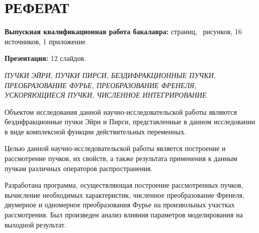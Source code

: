     \section*{РЕФЕРАТ}
    {
    \textbf{Выпускная квалификационная работа бакалавра:}
    \pageref{LastPage} страниц,
    \totalfigures\ рисунков,
    16 источников,
    1 приложение.

    \textbf{Презентация:} 12 слайдов.

    \textit{ПУЧКИ ЭЙРИ, ПУЧКИ ПИРСИ, БЕЗДИФРАКЦИОННЫЕ ПУЧКИ, \\ ПРЕОБРАЗОВАНИЕ ФУРЬЕ, ПРЕОБРАЗОВАНИЕ ФРЕНЕЛЯ, УСКОРЯЮЩИЕСЯ ПУЧКИ, ЧИСЛЕННОЕ
    ИНТЕГРИРОВАНИЕ}

    Объектом исследования данной научно-исследовательской работы
    являются бездифракционные пучки Эйри и Пирси, представленные в данном
    исследовании в виде комплексной функции действительных переменных.

    Целью данной научно-исследовательской работы является построение и
    рассмотрение пучков, их свойств, а также результата применения к данным пучкам различных операторов распространения.

    Разработана программа, осуществляющая построение
    рассмотренных пучков, вычисление необходимых характеристик, численное
    преобразование Френеля, двумерное и одномерное преобразования Фурье на произвольных участках рассмотрения. Был
    произведен анализ влияния параметров моделирования на выходной результат.


    }
    \newpage

    \newpage
    \tableofcontents
    \newpage


